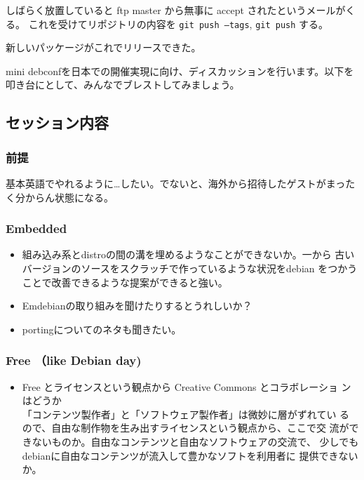 \documentclass[mingoth,a4paper]{jsarticle}
\begin{document}
しばらく放置していると
ftp master から無事に accept されたというメールがくる。
これを受けてリポジトリの内容を \texttt{git push --tags},  \texttt{git push} する。

新しいパッケージがこれでリリースできた。


mini debconfを日本での開催実現に向け、ディスカッションを行います。以下を
叩き台にとして、みんなでブレストしてみましょう。

\subsection{セッション内容}
\subsubsection{前提}
基本英語でやれるように…したい。でないと、海外から招待したゲストがまったく分からん状態になる。
\subsubsection{Embedded}
\begin{itemize}
 \item 組み込み系とdistroの間の溝を埋めるようなことができないか。一から
       古いバージョンのソースをスクラッチで作っているような状況をdebian
       をつかうことで改善できるような提案ができると強い。
 \item Emdebianの取り組みを聞けたりするとうれしいか？
 \item portingについてのネタも聞きたい。
\end{itemize}

\subsubsection{Free （like Debian day)}
\begin{itemize}
 \item Free とライセンスという観点から Creative Commons とコラボレーショ
       ンはどうか\\
       「コンテンツ製作者」と「ソフトウェア製作者」は微妙に層がずれてい
       るので、自由な制作物を生み出すライセンスという観点から、ここで交
       流ができないものか。自由なコンテンツと自由なソフトウェアの交流で、
       少しでもdebianに自由なコンテンツが流入して豊かなソフトを利用者に
       提供できないか。
\end{itemize}
\end{document}
